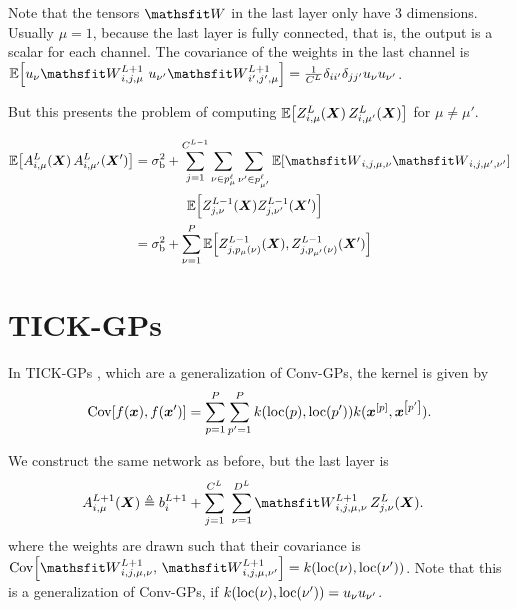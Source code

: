 \documentclass{article} %
\newcommand{\bracket}[3]{{\left#1 #3 \right#2}}
\newcommand{\bra}{\bracket{(}{)}}
\newcommand{\sqb}{\bracket{[}{]}}
\newcommand{\ssup}[1]{^{#1}}
\newcommand{\eqdef}{\triangleq}
\newcommand{\patch}[2]{{p\ssup{#1}_{#2}}}
\begin{document}
Note that the tensors $\etW$ in the last layer only have 3 dimensions. Usually
$\mu=1$, because the last layer is fully connected, that is, the output is a
scalar for each channel. The covariance of the weights in the last channel is
$\E\sqb{u_\nu\etW\ssup{L+1}_{i,j,\mu}\ u_{\nu'}\etW\ssup{L+1}_{i',j',\mu}} =
\frac{1}{C\ssup{L}}\delta_{ii'}\delta_{jj'}\evu_\nu \evu_{\nu'}$.

But this presents the problem of computing
$\E\sqb{\emZ\ssup{L}_{i,\mu}(\mX)\, \emZ\ssup{L}_{i,\mu'}(\mX)}$ for $\mu\neq
\mu'$.

\begin{equation}
\begin{aligned}
  \E\sqb{\emA\ssup{L}_{i,\mu}(\mX)\, \emA\ssup{L}_{i,\mu'}(\mX')} &= \sigma_\text{b}^2
  + \sum_{j=1}^{C\ssup{L-1}} \sum_{\nu\in \patch{\ell}{\mu}}\sum_{\nu'\in \patch{\ell}{\mu'}} \E\sqb{\etW_{i,j,\mu,\nu} \etW_{i,j,\mu',\nu'}}\\
  &\hspace{4em}\E\sqb{Z\ssup{L-1}_{j,\nu}(\mX)Z\ssup{L-1}_{j,\nu'}(\mX')} \\
  &= \sigma_\text{b}^2 + \sum_{\nu=1}^P \E\sqb{Z\ssup{L-1}_{j,p_\mu(\nu)}(\mX), Z\ssup{L-1}_{j,p_{\mu'}(\nu)}(\mX')}
\end{aligned}
\end{equation}


\section{TICK-GPs}
In TICK-GPs \citep{dutordoir2019tick}, which are a generalization of Conv-GPs, the kernel is given by
\begin{equation}
\Cov\sqb{f(\vx), f(\vx')} = \sum_{p=1}^P\sum_{p'=1}^P k\bra{\text{loc}\bra{p}, \text{loc}\bra{p'}} k(\vx^\sqb{p}, \vx^\sqb{p'}).
\end{equation}

We construct the same network as before, but the last layer is
\begin{align}
\emA_{i,\mu}\ssup{L+1}(\mX) &\eqdef \evb_i\ssup{L+1} +
\sum_{j=1}^{C\ssup{L}} \ \sum_{\nu=1}^{D\ssup{L}} \etW\ssup{L+1}_{i,j,\mu,\nu}\, \emZ\ssup{L}_{j,\nu}(\mX).
\label{eq:tickgp-network-final}
\end{align}
where the weights are drawn such that their covariance is
$\Cov\sqb{\etW\ssup{L+1}_{i,j,\mu,\nu},\, \etW\ssup{L+1}_{i,j,\mu,\nu'}} =
k(\text{loc}(\nu), \text{loc}(\nu'))$. Note that this is a generalization of
Conv-GPs, if $k(\text{loc}(\nu), \text{loc}(\nu')) = {u}_\nu {u}_{\nu'}$.
\end{document}
